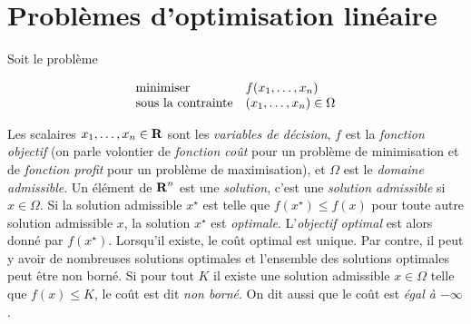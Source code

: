 \section{Problèmes d'optimisation linéaire}

Soit le problème

$$
\begin{array}{ll}
  \mbox{minimiser}   &  f(x_1, \ldots, x_n) \\
  \mbox{sous la contrainte} &  (x_1, \ldots, x_n)  \in \Omega
\end{array}
$$


Les scalaires $x_1, \ldots, x_n \in {\mbox{\bf R}}$ sont les \emph{variables de décision}, $f$  est la \emph{fonction objectif}
(on parle volontier de \emph{fonction coût} pour un problème de minimisation et de \emph{fonction profit} pour un problème de maximisation), et
$\Omega$ est le \emph{domaine admissible}. Un élément de ${\mbox{\bf R}}^n$ est une \emph{solution}, c'est une \emph{solution admissible}   si
$x
\in \Omega$. Si la solution admissible
$x^\star$ est telle que
$f(x^\star) \leq f(x)$ pour toute autre solution admissible
$x$,  la solution $x^\star$ est \emph{optimale}. L'\emph{objectif optimal}   est alors donné par
$f(x^\star)$. Lorsqu'il existe, le coût optimal est unique. Par contre, il peut y avoir de nombreuses solutions optimales et l'ensemble des solutions
optimales peut être non borné. Si pour tout
$K$ il existe une solution admissible $x \in \Omega$ telle que $f(x) \leq K$, le coût est dit \emph{non borné}. On
dit aussi que le  coût est \emph{égal à
$-\infty$}.\\

\newpage



